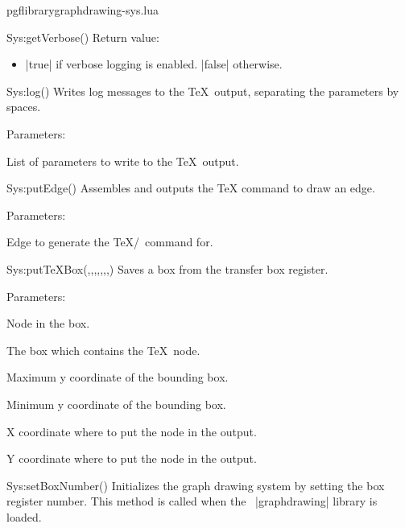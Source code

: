 \begin{filedescription}{pgflibrarygraphdrawing-sys.lua}
\begin{luacommand}{{Sys:getVerbose}()}
Return value:
\begin{itemize} \item[] |true| if verbose logging is enabled. |false| otherwise.  \end{itemize}


\end{luacommand}\begin{luacommand}{{Sys:log}()}
Writes log messages to the \TeX\ output, separating the parameters by spaces. 

Parameters:
\begin{parameterdescription}
	\item[\meta{...}] List of parameters to write to the \TeX\ output. 
\end{parameterdescription}



\end{luacommand}\begin{luacommand}{{Sys:putEdge}()}
Assembles and outputs the TeX command to draw an edge. 

Parameters:
\begin{parameterdescription}
	\item[\meta{edge}] Edge to generate the \TeX/\tikzname\ command for. 
\end{parameterdescription}



\end{luacommand}\begin{luacommand}{{Sys:putTeXBox}(,,,,,,,)}
Saves a box from the transfer box register. 

Parameters:
\begin{parameterdescription}
	\item[\meta{node}] Node in the box.\item[\meta{texnode}] The box which contains the \TeX\ node.\item[\meta{minX}] Maximum y coordinate of the bounding box.\item[\meta{minY}] Minimum y coordinate of the bounding box.\item[\meta{posX}] X coordinate where to put the node in the output.\item[\meta{posY}] Y coordinate where to put the node in the output. 
\end{parameterdescription}



\end{luacommand}\begin{luacommand}{{Sys:setBoxNumber}()}
Initializes the graph drawing system by setting the box register number.  This method is called when the \tikzname\ |graphdrawing| library is loaded. 


\end{luacommand}
\end{filedescription}
